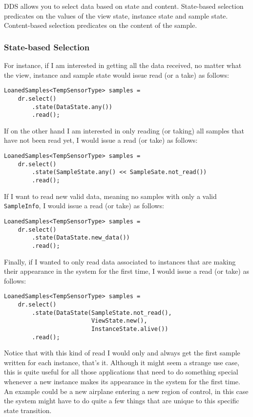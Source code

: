 \ac{DDS} allows you to select data based on state and content. State-based 
selection predicates on the values of the view state, instance state and sample state.
Content-based selection predicates on the content of the sample. 

\subsubsection{State-based Selection} 
For instance, 
if I am interested in getting all the data received, no matter what the view, 
instance and sample state would issue read (or a take) as follows:

\begin{lstlisting}[frame=tb]
  LoanedSamples<TempSensorType> samples = 
  	dr.select()
  		.state(DataState.any())
  		.read();
\end{lstlisting}

If on the other hand I am interested in only reading (or taking) 
all samples that have not been read yet, I would issue a read (or take) 
as follows:

\begin{lstlisting}[frame=tb]
  LoanedSamples<TempSensorType> samples = 
  	dr.select()
  		.state(SampleState.any() << SampleSate.not_read())
  		.read();
\end{lstlisting}

If I want to read new valid data, meaning no samples with only a valid \texttt{SampleInfo}, I would  issue a read (or take) as follows: 

\begin{lstlisting}[frame=tb]
  LoanedSamples<TempSensorType> samples = 
  	dr.select()
  		.state(DataState.new_data())
  		.read();
\end{lstlisting}

Finally, if I wanted to only read data associated to instances that are making 
their appearance in the system for the first time, I would issue a read (or take) as follows:

\begin{lstlisting}[frame=tb]
  LoanedSamples<TempSensorType> samples = 
  	dr.select()
  		.state(DataState(SampleState.not_read(), 
  		                 ViewState.new(), 
  		                 InstanceState.alive())
  		.read();
\end{lstlisting}

Notice that with this kind of read I would only and always get the 
first sample written for each instance, that's it. Although it might 
seem a strange use case, this is quite useful for all those applications 
that need to do something special whenever a new instance makes its appearance 
in the system for the first time. An example could be a new airplane entering a  
new region of control, in this case the system might have to do quite a few things 
that are unique to this specific state transition. 


